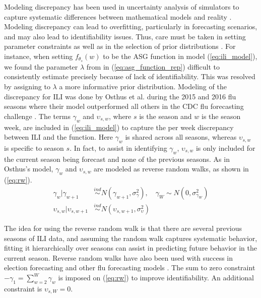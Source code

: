 Modeling discrepancy has been used in uncertainty analysis of 
simulators to capture systematic differences between mathematical models and 
reality \cite[]{ma2022multifidelity,brynjarsdottir2014learning,
arendt2012improving,kennedy2001bayesian}. Modeling discrepancy can lead to 
overfitting, particularly in forecasting scenarios, and may also lead to 
identifiability issues. 
Thus, care must be taken in setting parameter constraints as well as in the 
selection of prior distributions \cite[]{osthus2019dynamic,
brynjarsdottir2014learning}. 
For instance, when setting $f_{\theta_s}(w)$ to
be the ASG function
in model (\ref{eq:ili_model}), we found the parameter $\lambda$ from 
in (\ref{eq:asg_function_rep}) difficult to consistently 
estimate precisely because of lack of identifiability. This was resolved by 
assigning to $\lambda$ a more informative prior distribution.
Modeling of the discrepancy for ILI was done by Osthus et al. during the 2015 
and 2016 flu seasons where their model outperformed all others in the CDC flu 
forecasting challenge \cite[]{osthus2019dynamic}.
The terms $\gamma_w$ and $\upsilon_{s,w}$, where $s$ is the season and $w$ is the 
season week, are included in 
(\ref{eq:ili_model}) to capture the per week discrepancy between ILI and the 
function. Here $\gamma_w$ is shared across all seasons, whereas $\upsilon_{s,w}$
is specific to season $s$. In fact, to assist in identifying $\gamma_w$,
$\upsilon_{s,w}$ is only included for the current season being forecast and none of
the previous seasons.
 As in Osthus's model, 
$\gamma_w$ and $\upsilon_{s,w}$ are modeled as reverse random walks, as shown 
in (\ref{eq:rw}). 
\begin{equation}
    \begin{aligned}
    \label{eq:rw}
        \gamma_w|\gamma_{w + 1} &\overset{ind}{\sim} N(\gamma_{w+1},\sigma^2_{\gamma}), \quad
        \gamma_{W} \sim N(0,\sigma^2_{\gamma_W}) \\
        \upsilon_{s,w}|\upsilon_{s, w + 1} &\overset{ind}{\sim} N(\upsilon_{s, w+1},\sigma^2_{\upsilon})
    \end{aligned}
\end{equation}


The idea for using the reverse random walk is that there are several previous 
seasons of ILI data, and assuming the random walk captures systematic behavior, 
fitting it hierarchically over seasons can assist in predicting future behavior 
in the current season. 
Reverse random walks have also been used with success in election forecasting 
and other flu forecasting models \cite[]{osthus2021multiscale, 
osthus2019dynamic, linzer2013dynamic}. The sum to zero constraint 
$-\gamma_1 = \sum_{w=2}^W \gamma_w$ is imposed on (\ref{eq:rw}) to improve 
identifiability. An additional constraint is $\upsilon_{s, W} = 0$.










